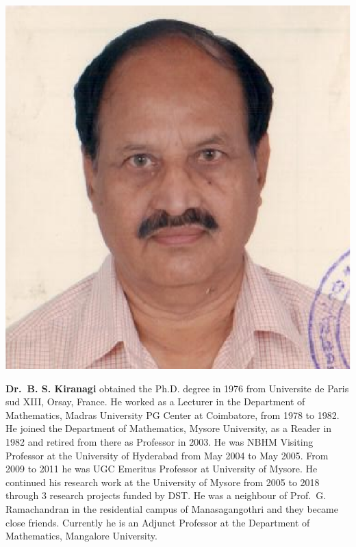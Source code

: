 \centerline{\includegraphics[scale=.5]{authorsphotos/Prof_B_S_Kiranagi.eps}}
\bigskip

\noindent
\textbf{Dr.\ B. S. Kiranagi} obtained the Ph.D. degree in 1976 from Universite de Paris sud XIII, Orsay, France. He worked as a Lecturer in the Department of Mathematics, Madras University PG Center at Coimbatore, from 1978 to 1982. He joined the Department of Mathematics, Mysore University, as a Reader in 1982 and retired from there as Professor in 2003. He was NBHM Visiting Professor at the University of Hyderabad from May 2004 to May 2005. From 2009 to 2011 he was UGC Emeritus Professor at University of Mysore. He continued his research work at the University of Mysore from 2005 to 2018 through 3 research projects funded by DST. He was a neighbour of Prof.\ G. Ramachandran in the residential campus of Manasagangothri and they became close friends. Currently he is an Adjunct Professor at the Department of Mathematics, Mangalore University.

